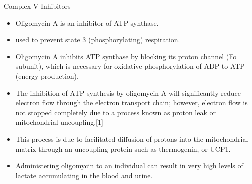 \documentclass[presentation, smaller]{beamer}
\begin{document}
\begin{frame}[label={sec:org0b8c749}]{Complex V Inhibitors}
\begin{itemize}
\item Oligomycin A is an inhibitor of ATP synthase.
\item used to prevent state 3 (phosphorylating) respiration.
\item Oligomycin A inhibits ATP synthase by blocking its proton channel
(Fo subunit), which is necessary for oxidative phosphorylation of
ADP to ATP (energy production).
\item The inhibition of ATP synthesis by oligomycin A will significantly
reduce electron flow through the electron transport chain; however,
electron flow is not stopped completely due to a process known as
proton leak or mitochondrial uncoupling.[1]
\item This process is due to facilitated diffusion of protons into the
mitochondrial matrix through an uncoupling protein such as
thermogenin, or UCP1.

\item Administering oligomycin to an individual can result in very high levels of lactate accumulating in the blood and urine.
\end{itemize}
\end{frame}
\end{document}
